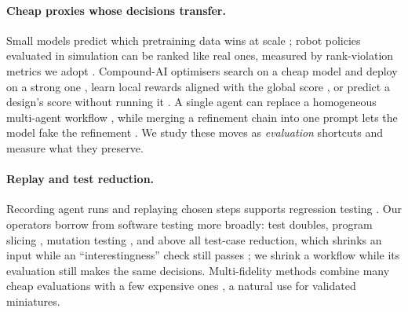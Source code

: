 \paragraph{Cheap proxies whose decisions transfer.}
Small models predict which pretraining data wins at scale \citep{magnusson2025datadecide,liu2024regmix}; robot
policies evaluated in simulation can be ranked like real ones, measured by rank-violation metrics
we adopt \citep{li2024evaluating}. Compound-AI optimisers search on a cheap model and deploy on a strong one
\citep{agrawal2025gepa,zhang2024aflow,hu2024automated,oved2026optimize}, learn local rewards aligned with the global score
\citep{wu2025optimas}, or predict a design's score without running it \citep{shang2024agentsquare}. A single
agent can replace a homogeneous multi-agent workflow \citep{xu2026rethinking}, while merging a refinement
chain into one prompt lets the model fake the refinement \citep{sun2024prompt}. We study these moves as
\emph{evaluation} shortcuts and measure what they preserve.

\paragraph{Replay and test reduction.}
Recording agent runs and replaying chosen steps supports regression testing \citep{chawla2026chronicle}. Our
operators borrow from software testing more broadly: test doubles, program slicing
\citep{weiser1984program}, mutation testing \citep{jia2011analysis}, and above all test-case reduction, which
shrinks an input while an ``interestingness'' check still passes \citep{zeller2002simplifying}; we shrink a
workflow while its evaluation still makes the same decisions. Multi-fidelity methods combine many
cheap evaluations with a few expensive ones \citep{peherstorfer2018survey,li2018hyperband}, a natural use for
validated miniatures.
